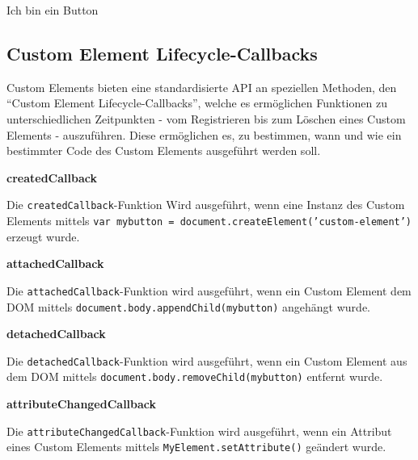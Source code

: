 \begin{Shaded}
\begin{Highlighting}[]
 \OperatorTok{=}  \NormalTok{() }\OperatorTok{\{}
  \NormalTok{(}\NormalTok{)}\OperatorTok{;}
\OperatorTok{\};}

 \OperatorTok{=} \OperatorTok{;}

Ich bin ein Button
\end{Highlighting}
\end{Shaded}


\subsection{Custom Element Lifecycle-Callbacks}\label{custom-element-lifecycle-callbacks}

Custom Elements bieten eine standardisierte API an speziellen Methoden, den ``Custom Element Lifecycle-Callbacks'', welche es ermöglichen Funktionen zu unterschiedlichen Zeitpunkten - vom Registrieren bis zum Löschen eines Custom Elements - auszuführen. Diese ermöglichen es, zu bestimmen, wann und wie ein bestimmter Code des Custom Elements ausgeführt werden soll.

\textbf{createdCallback}

Die \texttt{createdCallback}-Funktion Wird ausgeführt, wenn eine Instanz des Custom Elements mittels \texttt{var\ mybutton\ =\ document.createElement('custom-element')} erzeugt wurde.

\textbf{attachedCallback}

Die \texttt{attachedCallback}-Funktion wird ausgeführt, wenn ein Custom Element dem DOM mittels \texttt{document.body.appendChild(mybutton)} angehängt wurde.

\textbf{detachedCallback}

Die \texttt{detachedCallback}-Funktion wird ausgeführt, wenn ein Custom Element aus dem DOM mittels \texttt{document.body.removeChild(mybutton)} entfernt wurde.

\textbf{attributeChangedCallback}

Die \texttt{attributeChangedCallback}-Funktion wird ausgeführt, wenn ein Attribut eines Custom Elements mittels \texttt{MyElement.setAttribute()} geändert wurde.

